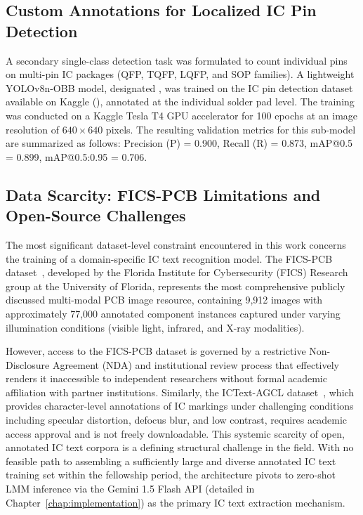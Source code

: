 \documentclass[12pt,a4paper]{report}
\begin{document}
\subsection{Custom Annotations for Localized IC Pin Detection}
\label{subsec:pin_dataset}

A secondary single-class detection task was formulated to count individual pins on multi-pin IC packages (QFP, TQFP, LQFP, and SOP families). A lightweight YOLOv8n-OBB model, designated , was trained on the IC pin detection dataset available on Kaggle (), annotated at the individual solder pad level. The training was conducted on a Kaggle Tesla T4 GPU accelerator for 100 epochs at an image resolution of $640 \times 640$ pixels. The resulting validation metrics for this sub-model are summarized as follows: Precision (P) = 0.900, Recall (R) = 0.873, mAP@0.5 = 0.899, mAP@0.5:0.95 = 0.706.

\subsection{Data Scarcity: FICS-PCB Limitations and Open-Source Challenges}
\label{subsec:fics_pcb}

The most significant dataset-level constraint encountered in this work concerns the training of a domain-specific IC text recognition model. The FICS-PCB dataset~\cite{lu2020ficspcb}, developed by the Florida Institute for Cybersecurity (FICS) Research group at the University of Florida, represents the most comprehensive publicly discussed multi-modal PCB image resource, containing 9,912 images with approximately 77,000 annotated component instances captured under varying illumination conditions (visible light, infrared, and X-ray modalities).

However, access to the FICS-PCB dataset is governed by a restrictive Non-Disclosure Agreement (NDA) and institutional review process that effectively renders it inaccessible to independent researchers without formal academic affiliation with partner institutions. Similarly, the ICText-AGCL dataset~\cite{ng2024ictext}, which provides character-level annotations of IC markings under challenging conditions including specular distortion, defocus blur, and low contrast, requires academic access approval and is not freely downloadable. This systemic scarcity of open, annotated IC text corpora is a defining structural challenge in the field. With no feasible path to assembling a sufficiently large and diverse annotated IC text training set within the fellowship period, the architecture pivots to zero-shot LMM inference via the Gemini 1.5 Flash API (detailed in Chapter~\ref{chap:implementation}) as the primary IC text extraction mechanism.
\end{document}
